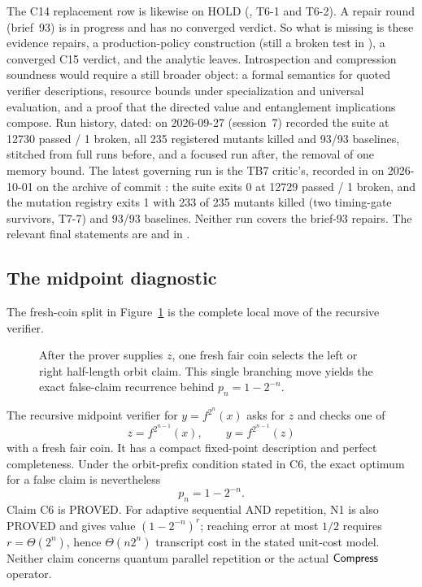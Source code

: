 The C14 replacement row is likewise on HOLD
(, T6-1 and T6-2).  A repair round (brief~93) is in
progress and has no converged verdict.  So what is missing is these evidence
repairs, a production-policy construction (still a broken test in
), a converged C15 verdict, and the analytic leaves.
Introspection
and compression soundness would require a still broader object: a formal
semantics for quoted verifier descriptions, resource bounds under
specialization and universal evaluation, and a proof that the directed value
and entanglement implications compose.  Run history, dated: on 2026-09-27
 (session~7) recorded the suite at 12730 passed / 1 broken,
all 235 registered mutants killed and 93/93 baselines, stitched from full runs
before, and a focused run after, the removal of one memory bound.  The latest
governing run is the TB7 critic's, recorded in  on
2026-10-01 on the archive of commit : the suite exits 0 at 12729
passed / 1 broken, and the mutation registry exits 1 with 233 of 235 mutants
killed (two timing-gate survivors, T7-7) and 93/93 baselines.  Neither run
covers the brief-93 repairs.  The relevant final statements are
 and  in
.


\subsection{The midpoint diagnostic}

The fresh-coin split in Figure~\ref{fig:D-midpoint-coin} is the complete local
move of the recursive verifier.
\begin{figure}[H]
\centering

\caption{After the prover supplies \(z\), one fresh fair coin selects the left or right half-length orbit claim.  This single branching move yields the exact false-claim recurrence behind \(p_n=1-2^{-n}\).}
\label{fig:D-midpoint-coin}
\end{figure}

The recursive midpoint verifier for \(y=f^{2^n}(x)\) asks for \(z\) and checks
one of
\[
 z=f^{2^{n-1}}(x),\qquad y=f^{2^{n-1}}(z)
\]
with a fresh fair coin.  It has a compact fixed-point description and perfect
completeness.  Under the orbit-prefix condition stated in C6, the exact optimum
for a false claim is nevertheless
\[
 p_n=1-2^{-n}.
\]
Claim C6 is \textsc{PROVED}.  For adaptive sequential AND repetition, N1 is
also \textsc{PROVED} and gives value \((1-2^{-n})^r\); reaching error at most
\(1/2\) requires \(r=\Theta(2^n)\), hence \(\Theta(n2^n)\) transcript cost in
the stated unit-cost model.  Neither claim concerns quantum parallel repetition
or the actual \(\mathsf{Compress}\) operator.

